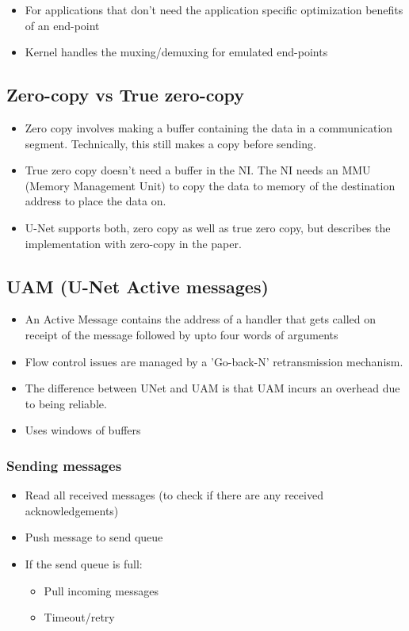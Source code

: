 \documentclass[a4paper]{article}
\begin{document}
\begin{itemize}
    \item
    For applications that don't need the application specific optimization
    benefits of an end-point
    \item
    Kernel handles the muxing/demuxing for emulated end-points
\end{itemize}

\subsection{Zero-copy vs True zero-copy}

\begin{itemize}
    \item
    Zero copy involves making a buffer containing the data in a communication segment. Technically, this still makes a copy before sending.
    \item
    True zero copy doesn't need a buffer in the NI. The NI needs an MMU (Memory Management Unit) to copy the data to memory of the destination address to place the data on.
    \item 
    U-Net supports both, zero copy as well as true zero copy, but describes the implementation with zero-copy in the paper.
\end{itemize}

\subsection{UAM (U-Net Active messages)}

\begin{itemize}
    \item 
    An Active Message contains the address of a handler that gets called on receipt of the message followed by upto four words of arguments
    \item
    Flow control issues are managed by a 'Go-back-N' retransmission mechanism.
    \item 
    The difference between UNet and UAM is that UAM incurs an overhead due to being reliable.
    \item
    Uses windows of buffers
\end{itemize}

\subsubsection{Sending messages}

\begin{itemize}
\item
    Read all received messages (to check if there are any received
    acknowledgements)
\item
    Push message to send queue
\item
    If the send queue is full:
    \begin{itemize}
        \item
        Pull incoming messages
    \item
        Timeout/retry
    \end{itemize}
\end{itemize}
\end{document}
